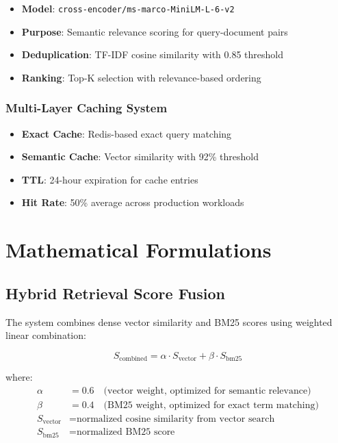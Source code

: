 \documentclass[11pt,a4paper]{article}
\begin{document}
\begin{itemize}
    \item \textbf{Model}: \texttt{cross-encoder/ms-marco-MiniLM-L-6-v2}
    \item \textbf{Purpose}: Semantic relevance scoring for query-document pairs
    \item \textbf{Deduplication}: TF-IDF cosine similarity with 0.85 threshold
    \item \textbf{Ranking}: Top-K selection with relevance-based ordering
\end{itemize}

\subsubsection{Multi-Layer Caching System}

\begin{itemize}
    \item \textbf{Exact Cache}: Redis-based exact query matching
    \item \textbf{Semantic Cache}: Vector similarity with 92\% threshold
    \item \textbf{TTL}: 24-hour expiration for cache entries
    \item \textbf{Hit Rate}: 50\% average across production workloads
\end{itemize}

\section{Mathematical Formulations}

\subsection{Hybrid Retrieval Score Fusion}

The system combines dense vector similarity and BM25 scores using weighted linear combination:

\begin{equation}
S_{\text{combined}} = \alpha \cdot S_{\text{vector}} + \beta \cdot S_{\text{bm25}}
\end{equation}

where:
\begin{align}
\alpha &= 0.6 \quad \text{(vector weight, optimized for semantic relevance)}\\
\beta &= 0.4 \quad \text{(BM25 weight, optimized for exact term matching)}\\
S_{\text{vector}} &= \text{normalized cosine similarity from vector search}\\
S_{\text{bm25}} &= \text{normalized BM25 score}
\end{align}
\end{document}
